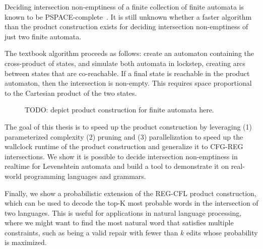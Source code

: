 Deciding intersection non-emptiness of a finite collection of finite automata is known to be PSPACE-complete~\cite{kozen1977lower}. It is still unknown whether a faster algorithm than the product construction exists for deciding intersection non-emptiness of just two finite automata.

The textbook algorithm proceeds as follows: create an automaton containing the cross-product of states, and simulate both automata in lockstep, creating arcs between states that are co-reachable. If a final state is reachable in the product automaton, then the intersection is non-empty. This requires space proportional to the Cartesian product of the two states.

\begin{figure}[h]
  \caption{TODO: depict product construction for finite automata here.}
  \end{figure}

The goal of this thesis is to speed up the product construction by leveraging (1) parameterized complexity (2) pruning and (3) parallelization to speed up the wallclock runtime of the product construction and generalize it to CFG-REG intersections. We show it is possible to decide intersection non-emptiness in realtime for Levenshtein automata and build a tool to demonstrate it on real-world programming languages and grammars.

Finally, we show a probabilistic extension of the REG-CFL product construction, which can be used to decode the top-K most probable words in the intersection of two languages. This is useful for applications in natural language processing, where we might want to find the most natural word that satisfies multiple constraints, such as being a valid repair with fewer than $k$ edits whose probability is maximized.

\clearpage